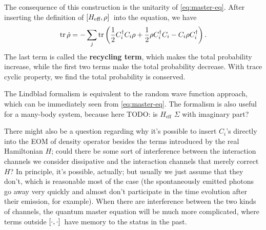 \documentclass[hyperref, a4paper]{article}
\newcommand*{\concept}[1]{{\textbf{#1}}}
\begin{document}
The consequence of this construction is the unitarity of \eqref{eq:master-eq}. 
After inserting the definition of $\comm*{H_{\text{eff}}}{\rho}$ into the equation, we have 
\begin{equation}
    \trace \dot{\rho} = - \sum_j \trace \left( \frac{1}{2} C_i^\dagger C_i \rho + \frac{1}{2} \rho C_i^\dagger C_i - C_i \rho C_i^\dagger \right).
\end{equation}
The last term is called the \concept{recycling term}, which makes the total probability increase, while the first 
two terms make the total probability decrease. With trace cyclic property, we find the total probability 
is conserved.

The Lindblad formalism is equivalent to the random wave function approach,
which can be immediately seen from \eqref{eq:master-eq}.
The formalism is also useful for a many-body system, 
because here TODO: is $H_{\text{eff}}$ $\Sigma$ with imaginary part?

There might also be a question regarding why it's possible 
to insert $C_i$'s directly into the EOM of density operator 
besides the terms introduced by the real Hamiltonian $H$; 
could there be some sort of interference between 
the interaction channels we consider dissipative and 
the interaction channels that merely correct $H$?
In principle, it's possible, actually; 
but usually we just assume that they don't, 
which is reasonable most of the case 
(the spontaneously emitted photons go away very quickly 
and almost don't participate in the time evolution after their emission, for example).
When there are interference between the two kinds of channels, 
the quantum master equation will be much more complicated, 
where terms outside $\comm*{\cdot}{\cdot}$
have memory to the status in the past.
\end{document}
